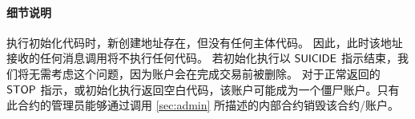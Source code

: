 \paragraph{细节说明} 
执行初始化代码时，新创建地址存在，但没有任何主体代码。
因此，此时该地址接收的任何消息调用将不执行任何代码。
若初始化执行以 $\mathsf{SUICIDE}$ 指示结束，我们将无需考虑这个问题，因为账户会在完成交易前被删除。
对于正常返回的 $\mathsf{STOP}$ 指示，或初始化执行返回空白代码，该账户可能成为一个僵尸账户。只有此合约的管理员能够通过调用 \cref{sec:admin} 所描述的内部合约销毁该合约/账户。
